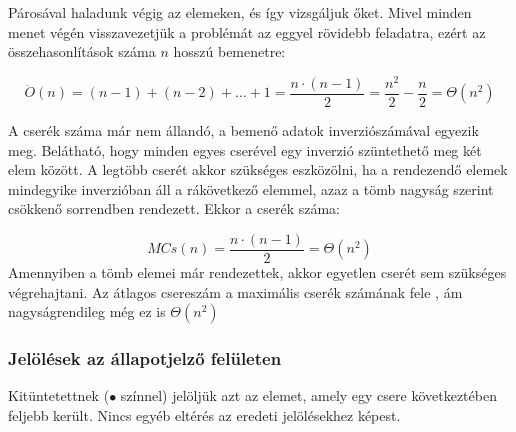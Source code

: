 \documentclass{elteikthesis}
\newcommand{\hiddensubsubsection}[1]{
	\stepcounter{subsubsection}
	\subsubsection*{{#1}}	
}
\begin{document}
Párosával haladunk végig az elemeken, és így vizsgáljuk őket. Mivel minden menet végén visszavezetjük a problémát az eggyel rövidebb feladatra, ezért az összehasonlítások száma $n$ hosszú bemenetre:\par
$$\ddot{O}(n)=(n-1)+(n-2)+\ldots+1=\frac{n\cdot(n-1)}{2}=\frac{n^2}{2}-\frac{n}{2}=\Theta(n^2)$$
\par A cserék száma már nem állandó, a bemenő adatok inverziószámával egyezik meg. Belátható, hogy minden egyes cserével egy inverzió szüntethető meg két elem között. A legtöbb cserét akkor szükséges eszközölni, ha a rendezendő elemek mindegyike inverzióban áll a rákövetkező elemmel, azaz a tömb nagyság szerint csökkenő sorrendben rendezett. Ekkor a cserék száma:\par
$$MCs(n)=\frac{n\cdot(n-1)}{2}=\Theta(n^2)$$
Amennyiben a tömb elemei már rendezettek, akkor egyetlen cserét sem szükséges végrehajtani.
Az átlagos csereszám a maximális cserék számának fele \cite{Fekete}, ám nagyságrendileg még ez is $\Theta(n^2)$
\hiddensubsubsection{Jelölések az állapotjelző felületen}
Kitüntetettnek (\textcolor{select}{\Huge$\bullet$} színnel) jelöljük azt az elemet, amely egy csere következtében feljebb került. Nincs egyéb eltérés az eredeti jelölésekhez képest.
\end{document}
